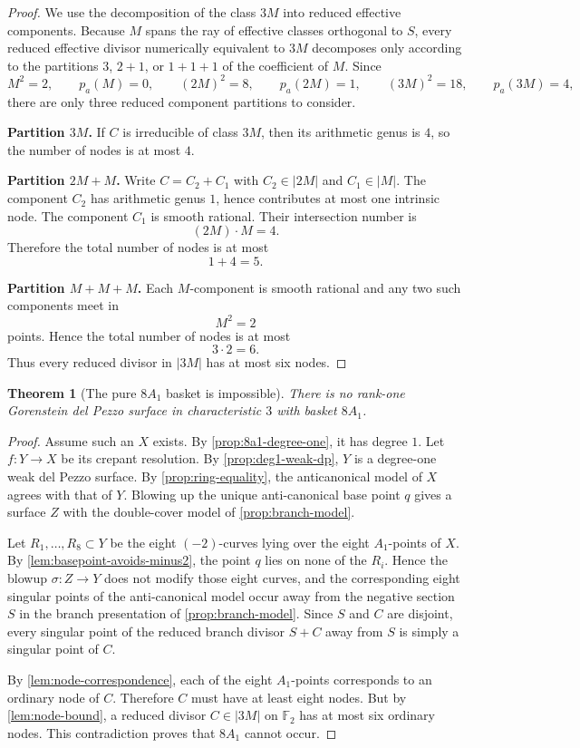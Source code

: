 \documentclass[11pt]{article}
\newtheorem{theorem}{Theorem}[section]
\theoremstyle{definition}
\begin{document}
\begin{proof}
We use the decomposition of the class $3M$ into reduced effective components. Because $M$ spans the ray of effective classes orthogonal to $S$, every reduced effective divisor numerically equivalent to $3M$ decomposes only according to the partitions $3$, $2+1$, or $1+1+1$ of the coefficient of $M$. Since
\[
M^2=2,
\qquad
p_a(M)=0,
\qquad
(2M)^2=8,
\qquad
p_a(2M)=1,
\qquad
(3M)^2=18,
\qquad
p_a(3M)=4,
\]
there are only three reduced component partitions to consider.

\medskip
\noindent
\textbf{Partition $3M$.}
If $C$ is irreducible of class $3M$, then its arithmetic genus is $4$, so the number of nodes is at most $4$.

\medskip
\noindent
\textbf{Partition $2M+M$.}
Write $C=C_2+C_1$ with $C_2\in |2M|$ and $C_1\in |M|$. The component $C_2$ has arithmetic genus $1$, hence contributes at most one intrinsic node. The component $C_1$ is smooth rational. Their intersection number is
\[
(2M)\cdot M=4.
\]
Therefore the total number of nodes is at most
\[
1+4=5.
\]

\medskip
\noindent
\textbf{Partition $M+M+M$.}
Each $M$-component is smooth rational and any two such components meet in
\[
M^2=2
\]
points. Hence the total number of nodes is at most
\[
3\cdot 2=6.
\]
Thus every reduced divisor in $|3M|$ has at most six nodes.
\end{proof}

\begin{theorem}[The pure $8A_1$ basket is impossible]\label{thm:pure8a1-impossible}
There is no rank-one Gorenstein del Pezzo surface in characteristic $3$ with basket $8A_1$.
\end{theorem}

\begin{proof}
Assume such an $X$ exists. By \cref{prop:8a1-degree-one}, it has degree $1$. Let $f\colon Y\to X$ be its crepant resolution. By \cref{prop:deg1-weak-dp}, $Y$ is a degree-one weak del Pezzo surface. By \cref{prop:ring-equality}, the anticanonical model of $X$ agrees with that of $Y$. Blowing up the unique anti-canonical base point $q$ gives a surface $Z$ with the double-cover model of \cref{prop:branch-model}.

Let $R_1,\dots,R_8\subset Y$ be the eight $(-2)$-curves lying over the eight $A_1$-points of $X$. By \cref{lem:basepoint-avoids-minus2}, the point $q$ lies on none of the $R_i$. Hence the blowup $\sigma\colon Z\to Y$ does not modify those eight curves, and the corresponding eight singular points of the anti-canonical model occur away from the negative section $S$ in the branch presentation of \cref{prop:branch-model}. Since $S$ and $C$ are disjoint, every singular point of the reduced branch divisor $S+C$ away from $S$ is simply a singular point of $C$.

By \cref{lem:node-correspondence}, each of the eight $A_1$-points corresponds to an ordinary node of $C$. Therefore $C$ must have at least eight nodes. But by \cref{lem:node-bound}, a reduced divisor $C\in |3M|$ on $\mathbb F_2$ has at most six ordinary nodes. This contradiction proves that $8A_1$ cannot occur.
\end{proof}
\end{document}
